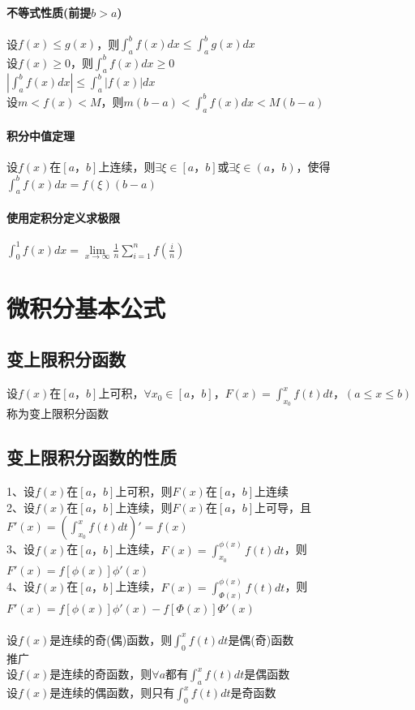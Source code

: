 \documentclass{article}
\begin{document}
\begin{flushleft}
	\paragraph{不等式性质(前提$b>a$)}
	设$f(x)\le g(x)$，则$\int_{a}^{b}f(x)dx\le \int_{a}^{b}g(x)dx$\\
	设$f(x)\ge 0$，则$\int_{a}^{b}f(x)dx \ge 0$\\
	$|\int_{a}^{b}f(x)dx| \le \int_{a}^{b}|f(x)|dx$\\
	设$m<f(x)<M$，则$m(b-a)<\int_{a}^{b}f(x)dx<M(b-a)$\\
	\paragraph{积分中值定理}
	设$f(x)$在$[a，b]$上连续，则$\exists \xi \in [a，b]$或$\exists \xi \in (a，b)$，使得$\int_{a}^{b}f(x)dx=f(\xi)(b-a)$\\
	
	\paragraph{使用定积分定义求极限}
	$\int_{0}^{1}f(x)dx=\lim\limits_{x\to \infty}\frac{1}{n}\sum_{i=1}^{n}f(\frac{i}{n})$\\
	
	\section{微积分基本公式}
	
	\subsection{变上限积分函数}
	设$f(x)$在$[a，b]$上可积，$\forall x_0\in [a，b]$，$F(x)=\int_{x_0}^{x}f(t)dt，(a\le x\le b)$称为变上限积分函数\\
	\subsection{变上限积分函数的性质}
	1、设$f(x)$在$[a，b]$上可积，则$F(x)$在$[a，b]$上连续\\
	2、设$f(x)$在$[a，b]$上连续，则$F(x)$在$[a，b]$上可导，且$F'(x)=(\int_{x_0}^{x}f(t)dt)'=f(x)$\\
	3、设$f(x)$在$[a，b]$上连续，$F(x)=\int_{x_0}^{\phi(x)}f(t)dt$，则$F'(x)=f[\phi(x)]\phi'(x)$\\
	4、设$f(x)$在$[a，b]$上连续，$F(x)=\int_{\Phi(x)}^{\phi(x)}f(t)dt$，则$F'(x)=f[\phi(x)]\phi'(x)-f[\Phi(x)]\Phi'(x)$\\
	~\\
	设$f(x)$是连续的奇(偶)函数，则$\int_{0}^{x}f(t)dt$是偶(奇)函数\\
	推广\\
	设$f(x)$是连续的奇函数，则$\forall a$都有$\int_{a}^{x}f(t)dt$是偶函数\\
	设$f(x)$是连续的偶函数，则只有$\int_{0}^{x}f(t)dt$是奇函数\\

\end{flushleft}
\end{document}
